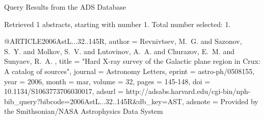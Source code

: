 Query Results from the ADS Database


Retrieved 1 abstracts, starting with number 1.  Total number selected: 1.

@ARTICLE{2006AstL...32..145R,
   author = {{Revnivtsev}, M.~G. and {Sazonov}, S.~Y. and {Molkov}, S.~V. and 
	{Lutovinov}, A.~A. and {Churazov}, E.~M. and {Sunyaev}, R.~A.
	},
    title = "{Hard X-ray survey of the Galactic plane region in Crux: A catalog of sources}",
  journal = {Astronomy Letters},
   eprint = {astro-ph/0508155},
     year = 2006,
    month = mar,
   volume = 32,
    pages = {145-148},
      doi = {10.1134/S1063773706030017},
   adsurl = {http://adsabs.harvard.edu/cgi-bin/nph-bib_query?bibcode=2006AstL...32..145R&db_key=AST},
  adsnote = {Provided by the Smithsonian/NASA Astrophysics Data System}
}


